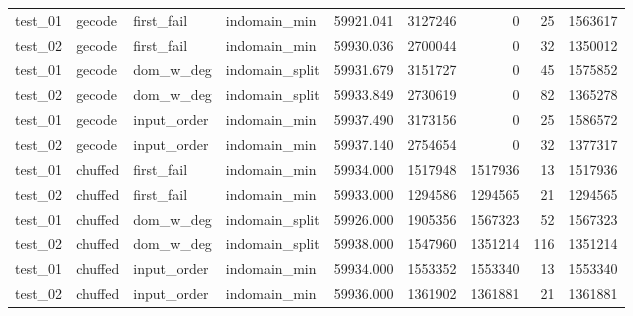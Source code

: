 \begin{longtable}{l l l l r r r r r}
    test\_01         & gecode          & first\_fail       & indomain\_min     & 59921.041          & 3127246        & 0                 & 25             & 1563617            \\
    test\_02         & gecode          & first\_fail       & indomain\_min     & 59930.036          & 2700044        & 0                 & 32             & 1350012            \\
    \midrule
    test\_01         & gecode          & dom\_w\_deg       & indomain\_split   & 59931.679          & 3151727        & 0                 & 45             & 1575852            \\
    test\_02         & gecode          & dom\_w\_deg       & indomain\_split   & 59933.849          & 2730619        & 0                 & 82             & 1365278            \\
    \midrule
    test\_01         & gecode          & input\_order      & indomain\_min     & 59937.490          & 3173156        & 0                 & 25             & 1586572            \\
    test\_02         & gecode          & input\_order      & indomain\_min     & 59937.140          & 2754654        & 0                 & 32             & 1377317            \\
    \midrule
    test\_01         & chuffed         & first\_fail       & indomain\_min     & 59934.000          & 1517948        & 1517936           & 13             & 1517936            \\
    test\_02         & chuffed         & first\_fail       & indomain\_min     & 59933.000          & 1294586        & 1294565           & 21             & 1294565            \\
    \midrule
    test\_01         & chuffed         & dom\_w\_deg       & indomain\_split   & 59926.000          & 1905356        & 1567323           & 52             & 1567323            \\
    test\_02         & chuffed         & dom\_w\_deg       & indomain\_split   & 59938.000          & 1547960        & 1351214           & 116            & 1351214            \\
    \midrule
    test\_01         & chuffed         & input\_order      & indomain\_min     & 59934.000          & 1553352        & 1553340           & 13             & 1553340            \\
    test\_02         & chuffed         & input\_order      & indomain\_min     & 59936.000          & 1361902        & 1361881           & 21             & 1361881            \\
\end{longtable}

